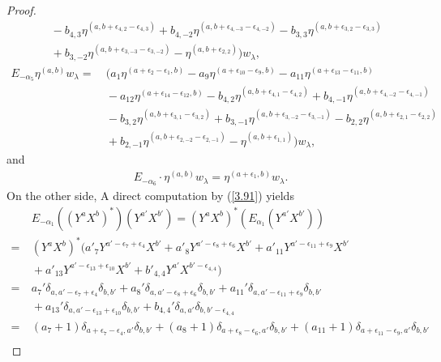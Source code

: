 \documentclass[12pt]{article}
\numberwithin{equation}{section}
\theoremstyle{definition}
\theoremstyle{remark}
\begin{document}
\begin{proof}
\begin{align}
		&\:-b_{4,3}\eta^{(a,b+\epsilon_{4,2}-\epsilon_{4,3})}+b_{4,-2}\eta^{(a,b+\epsilon_{4,-3}-\epsilon_{4,-2})}-b_{3,3}\eta^{(a,b+\epsilon_{3,2}-\epsilon_{3,3})} \nonumber\\
		&\:+b_{3,-2}\eta^{(a,b+\epsilon_{3,-3}-\epsilon_{3,-2})}-\eta^{(a,b+\epsilon_{2,2})})w_{\lambda}, 
	\end{align}
	\begin{align}
		E_{-\alpha_5}\eta^{(a,b)}w_{\lambda}=&\:(a_1\eta^{(a+\epsilon_2-\epsilon_1,b)}-a_{9}\eta^{(a+\epsilon_{10}-\epsilon_9,b)}-a_{11}\eta^{(a+\epsilon_{13}-\epsilon_{11},b)}\nonumber  \\
		&\:-a_{12}\eta^{(a+\epsilon_{14}-\epsilon_{12},b)}-b_{4,2}\eta^{(a,b+\epsilon_{4,1}-\epsilon_{4,2})}+b_{4,-1}\eta^{(a,b+\epsilon_{4,-2}-\epsilon_{4,-1})}\nonumber\\
		&\:-b_{3,2}\eta^{(a,b+\epsilon_{3,1}-\epsilon_{3,2})}+b_{3,-1}\eta^{(a,b+\epsilon_{3,-2}-\epsilon_{3,-1})}-b_{2,2}\eta^{(a,b+\epsilon_{2,1}-\epsilon_{2,2})}\nonumber\\
		&\:+b_{2,-1}\eta^{(a,b+\epsilon_{2,-2}-\epsilon_{2,-1})}-\eta^{(a,b+\epsilon_{1,1})})w_{\lambda}, 
	\end{align}
	and
	\begin{eqnarray}
		E_{-\alpha_6}\cdot \eta^{(a,b)}w_{\lambda}=\eta^{(a+\epsilon_1,b)}w_{\lambda}. \label{-al6}
	\end{eqnarray}
	On the other side, A direct computation by (\ref{3.91}) yields
	\begin{align}
		&\:E_{-\alpha_1}((Y^aX^b)^*)(Y^{a'}X^{b'})=(Y^aX^b)^*(E_{\alpha_1}(Y^{a'}X^{b'}))\nonumber\\
		=&\:(Y^aX^b)^*(a'_7Y^{a'-\epsilon_7+\epsilon_4}X^{b'}+a'_8Y^{a'-\epsilon_8+\epsilon_6}X^{b'}+a'_{11}Y^{a'-\epsilon_{11}+\epsilon_{9}}X^{b'}\nonumber\\
		&\:+a'_{13}Y^{a'-\epsilon_{13}+\epsilon_{10}}X^{b'}+b'_{4,4}Y^{a'}X^{b'-\epsilon_{4,4}})\nonumber\\
		=&\:a_7'\delta_{a,a'-\epsilon_7+\epsilon_4}\delta_{b,b'}+a_8'\delta_{a,a'-\epsilon_8+\epsilon_6}\delta_{b,b'}+a_{11}'\delta_{a,a'-\epsilon_{11}+\epsilon_9}\delta_{b,b'}\nonumber\\
		&\:+a_{13}'\delta_{a,a'-\epsilon_{13}+\epsilon_{10}}\delta_{b,b'}+b_{4,4}'\delta_{a,a'}\delta_{b,b'-\epsilon_{4,4}}\nonumber\\
		=&\:(a_7+1)\delta_{a+\epsilon_7-\epsilon_4,a'}\delta_{b,b'}+(a_8+1)\delta_{a+\epsilon_8-\epsilon_6,a'}\delta_{b,b'}+(a_{11}+1)\delta_{a+\epsilon_{11}-\epsilon_9,a'}\delta_{b,b'}\nonumber\\

\end{align}
\end{proof}
\end{document}
